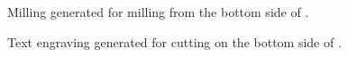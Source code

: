 \documentclass[11pt]{book}
\begin{document}
\begin{figure}
	\caption{Milling generated for milling from the bottom side of .}
	\label{fig:BottomMilling}
\end{figure}

\begin{figure}
	\caption{Text engraving generated for cutting on the bottom side of .}
	\label{fig:BottomText}
\end{figure}

\clearpage
\end{document}
